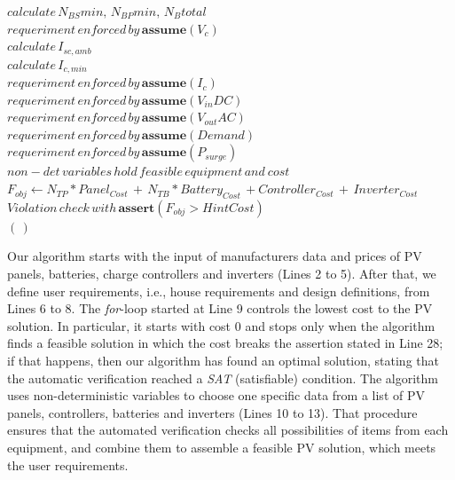 \documentclass[10pt,conference]{IEEEtran}
\begin{document}
\begin{algorithm}
\begin{algorithmic}[1]
\begin{scriptsize}
	\STATE $calculate \, N_{BS}min, \, N_{BP}min, \, N_{B}total$ \\
	\STATE $requeriment \, enforced \, by \, \textbf{assume}(V_{c})$ \\
 	\STATE $calculate \, I_{sc,amb}$ \\
 	\STATE $calculate \, I_{c,min}$ \\
 	\STATE $requeriment \, enforced \, by \, \textbf{assume}(I_{c})$ \\
	\STATE $requeriment \, enforced \, by \, \textbf{assume}(V_{in}DC)$ \\
	\STATE $requeriment \, enforced \, by \, \textbf{assume}(V_{out}AC)$ \\
	\STATE $requeriment \, enforced \, by \, \textbf{assume}(Demand)$ \\
	\STATE $requeriment \, enforced \, by \, \textbf{assume}(P_{surge})$ \\
	\STATE $non-det \, variables \, hold \, feasible \, equipment \, and \ cost $ \\
	\STATE $F_{obj} \leftarrow  N_{TP}*Panel_{Cost} \, + \, N_{TB}*Battery_{Cost} \, + Controller_{Cost} \, + \, Inverter_{Cost}$ \\
	\STATE $Violation \, check \, with \, \textbf{assert}(F_{obj} > HintCost)$ \\
  \ENDFOR
 \RETURN $(\,)$ 
  \end{scriptsize}
 \end{algorithmic} 
 \label{alg:verification-algorithm}
 \end{algorithm}
 
Our algorithm starts with the input of manufacturers data and prices of PV panels, batteries, charge controllers and inverters (Lines 2 to 5). After that, we define user requirements, i.e., house requirements and design definitions, from Lines 6 to 8. The \textit{for}-loop started at Line 9 controls the lowest cost to the PV solution. In particular, it starts with cost $0$ and stops only when the algorithm finds a feasible solution in which the cost breaks the assertion stated in Line 28; if that happens, then our algorithm has found an optimal solution, stating that the automatic verification reached a \textit{SAT} (satisfiable) condition. The algorithm uses non-deterministic variables to choose one specific data from a list of PV panels, controllers, batteries and inverters (Lines 10 to 13). That procedure ensures that the automated verification checks all possibilities of items from each equipment, and combine them to assemble a feasible PV solution, which meets the user requirements.
\end{document}
